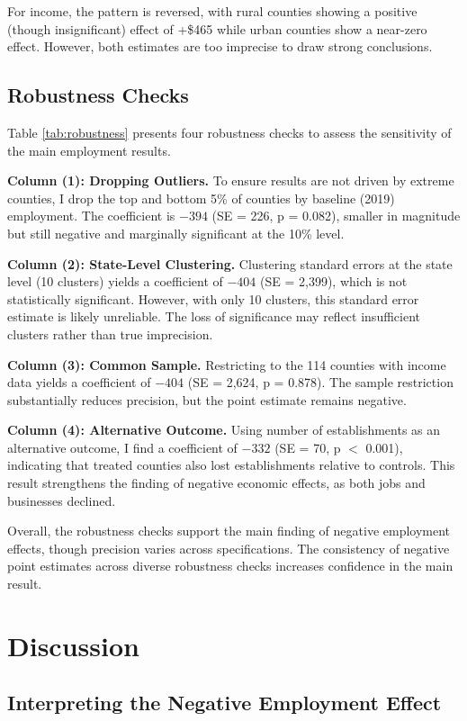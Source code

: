 \documentclass[12pt]{article}
\begin{document}
For income, the pattern is reversed, with rural counties showing a positive (though insignificant) effect of +\$465 while urban counties show a near-zero effect. However, both estimates are too imprecise to draw strong conclusions.

\subsection{Robustness Checks}

Table \ref{tab:robustness} presents four robustness checks to assess the sensitivity of the main employment results.

\textbf{Column (1): Dropping Outliers.} To ensure results are not driven by extreme counties, I drop the top and bottom 5\% of counties by baseline (2019) employment. The coefficient is $-394$ (SE = 226, p = 0.082), smaller in magnitude but still negative and marginally significant at the 10\% level.

\textbf{Column (2): State-Level Clustering.} Clustering standard errors at the state level (10 clusters) yields a coefficient of $-404$ (SE = 2,399), which is not statistically significant. However, with only 10 clusters, this standard error estimate is likely unreliable. The loss of significance may reflect insufficient clusters rather than true imprecision.

\textbf{Column (3): Common Sample.} Restricting to the 114 counties with income data yields a coefficient of $-404$ (SE = 2,624, p = 0.878). The sample restriction substantially reduces precision, but the point estimate remains negative.

\textbf{Column (4): Alternative Outcome.} Using number of establishments as an alternative outcome, I find a coefficient of $-332$ (SE = 70, p $<$ 0.001), indicating that treated counties also lost establishments relative to controls. This result strengthens the finding of negative economic effects, as both jobs and businesses declined.

Overall, the robustness checks support the main finding of negative employment effects, though precision varies across specifications. The consistency of negative point estimates across diverse robustness checks increases confidence in the main result.

\section{Discussion}

\subsection{Interpreting the Negative Employment Effect}
\end{document}
